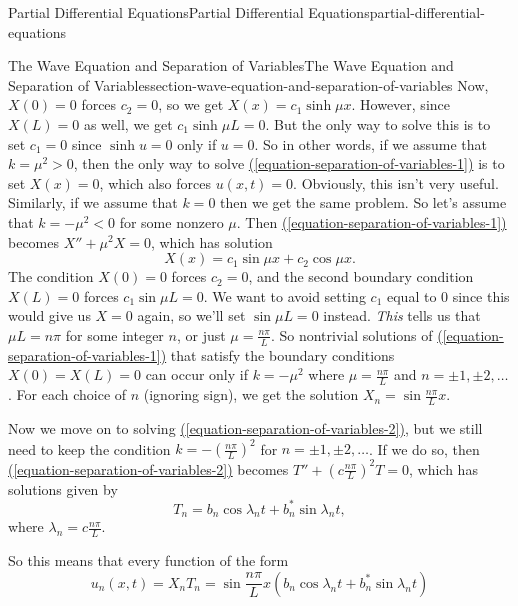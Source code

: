 \documentclass[oneside,10pt,]{book}
\numberwithin{equation}{section}
\newcommand{\lt}{<}
\newcommand{\gt}{>}
\begin{document}
\begin{chapterptx}{Partial Differential Equations}{}{Partial Differential Equations}{}{}{partial-differential-equations}
\begin{sectionptx}{The Wave Equation and Separation of Variables}{}{The Wave Equation and Separation of Variables}{}{}{section-wave-equation-and-separation-of-variables}
Now, \(X(0)=0\) forces \(c_{2} = 0\), so we get \(X(x) = c_{1}\sinh\mu x\). However, since \(X(L) = 0\) as well, we get \(c_{1}\sinh\mu L = 0\). But the only way to solve this is to set \(c_{1} = 0\) since \(\sinh u = 0\) only if \(u=0\). So in other words, if we assume that \(k = \mu^{2}\gt0\), then the only way to solve \hyperref[equation-separation-of-variables-1]{(\ref{equation-separation-of-variables-1})} is to set \(X(x) = 0\), which also forces \(u(x,t) = 0\). Obviously, this isn't very useful. Similarly, if we assume that \(k=0\) then we get the same problem. So let's assume that \(k=-\mu^{2}\lt0\) for some nonzero \(\mu\). Then \hyperref[equation-separation-of-variables-1]{(\ref{equation-separation-of-variables-1})} becomes \(X''+\mu^{2}X = 0\), which has solution%
%
\begin{equation*}
X(x) = c_{1}\sin\mu x + c_{2}\cos \mu x.
\end{equation*}
\hypertarget{p-658}{}%
The condition \(X(0) = 0\) forces \(c_{2} = 0\), and the second boundary condition \(X(L) = 0\) forces \(c_{1}\sin \mu L = 0\). We want to avoid setting \(c_{1}\) equal to \(0\) since this would give us \(X=0\) again, so we'll set \(\sin \mu L= 0\) instead. \emph{This} tells us that \(\mu L = n\pi\) for some integer \(n\), or just \(\mu = \frac{n\pi}{L}\). So nontrivial solutions of \hyperref[equation-separation-of-variables-1]{(\ref{equation-separation-of-variables-1})} that satisfy the boundary conditions \(X(0)=X(L) = 0\) can occur only if \(k = -\mu^{2}\) where \(\mu = \frac{n\pi}{L}\) and \(n=\pm1,\pm2,\ldots\). For each choice of \(n\) (ignoring sign), we get the solution \(X_{n} = \sin\frac{n\pi}{L}x\).%
\par
\hypertarget{p-659}{}%
Now we move on to solving \hyperref[equation-separation-of-variables-2]{(\ref{equation-separation-of-variables-2})}, but we still need to keep the condition \(k=-(\frac{n\pi}{L})^{2}\) for \(n=\pm1,\pm2,\ldots\). If we do so, then \hyperref[equation-separation-of-variables-2]{(\ref{equation-separation-of-variables-2})} becomes \(T''+(c\frac{n\pi}{L})^{2}T=0\), which has solutions given by%
\begin{equation*}
T_{n} = b_{n}\cos\lambda_{n}t+b^{*}_{n}\sin\lambda_{n}t,
\end{equation*}
where \(\lambda_{n} = c\frac{n\pi}{L}\).%
\par
\hypertarget{p-660}{}%
So this means that every function of the form%
\begin{equation*}
u_{n}(x,t) = X_{n}T_{n} = \sin\frac{n\pi}{L}x\left(b_{n}\cos\lambda_{n}t+b^{*}_{n}\sin\lambda_{n}t\right)

\end{equation*}
\end{sectionptx}
\end{chapterptx}
\end{document}
